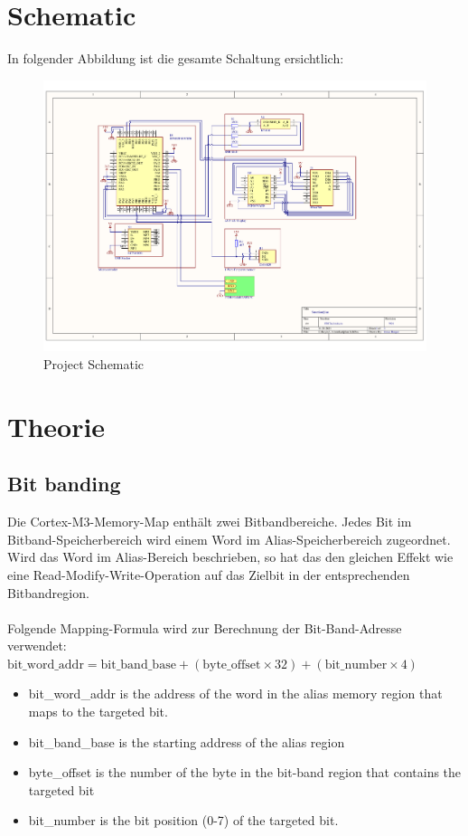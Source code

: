 \documentclass[12pt,a4paper]{article}
\begin{document}
\section{Schematic}
In folgender Abbildung ist die gesamte Schaltung ersichtlich:
\begin{figure}[H]
	\centering
	\includegraphics[clip, trim={3cm 4cm 5cm 2cm}, width=1\textwidth]{stromlaufplan_V01.pdf} %
	\caption{Project Schematic}
	\label{figure:schematic}
\end{figure}

\pagebreak

\section{Theorie}
\subsection{Bit banding}
Die Cortex-M3-Memory-Map enthält zwei Bitbandbereiche. Jedes Bit im Bitband-Speicherbereich wird einem Word im Alias-Speicherbereich zugeordnet. Wird das Word im Alias-Bereich beschrieben, so hat das den gleichen Effekt wie eine Read-Modify-Write-Operation auf das Zielbit in der entsprechenden Bitbandregion.\\
\\Folgende Mapping-Formula wird zur Berechnung der Bit-Band-Adresse verwendet:\\
$\text{bit\_word\_addr} = \text{bit\_band\_base} + (\text{byte\_offset} \times 32) + (\text{bit\_number} \times 4)$

\begin{itemize}
	\item bit\_word\_addr is the address of the word in the alias memory region that maps to the targeted bit.
	\item bit\_band\_base is the starting address of the alias region
	\item byte\_offset is the number of the byte in the bit-band region that contains the targeted bit
	\item bit\_number is the bit position (0-7) of the targeted bit.
\end{itemize}
\end{document}
